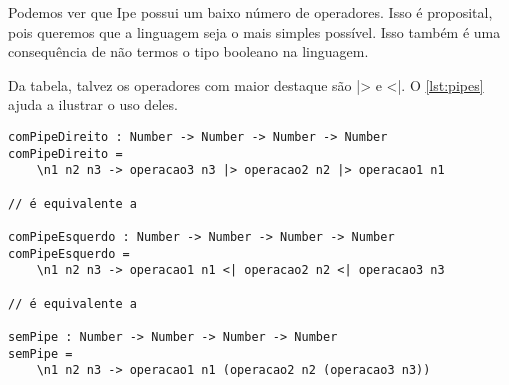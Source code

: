 \begin{table}[htb]
    \caption[Operadores em Ipe]{Operadores em Ipe}
    \label{tab:operadores}
\end{table}

Podemos ver que Ipe possui um baixo número de operadores. Isso é proposital, pois
queremos que a linguagem seja o mais simples possível. Isso também é uma consequência
de não termos o tipo booleano na linguagem.

Da tabela, talvez os operadores com maior destaque são |> e <|. O \autoref{lst:pipes}
ajuda a ilustrar o uso deles.

\begin{lstlisting}[label={lst:pipes},caption={Exemplos de uso dos operadores de pipe}]
comPipeDireito : Number -> Number -> Number -> Number
comPipeDireito =
    \n1 n2 n3 -> operacao3 n3 |> operacao2 n2 |> operacao1 n1

// é equivalente a

comPipeEsquerdo : Number -> Number -> Number -> Number
comPipeEsquerdo =
    \n1 n2 n3 -> operacao1 n1 <| operacao2 n2 <| operacao3 n3

// é equivalente a

semPipe : Number -> Number -> Number -> Number
semPipe =
    \n1 n2 n3 -> operacao1 n1 (operacao2 n2 (operacao3 n3))
\end{lstlisting}

